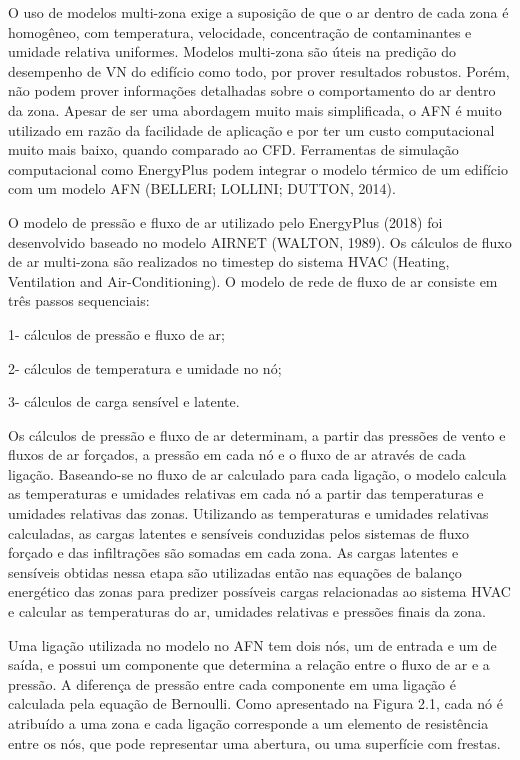\documentclass[brazil,hardcopy,openany,a5paper]{ufscthesis}
\begin{document}
	O uso de modelos multi-zona exige a suposição de que o ar dentro de cada zona é homogêneo, com temperatura, velocidade, concentração de contaminantes e umidade relativa uniformes. Modelos multi-zona são úteis na predição do desempenho de VN do edifício como todo, por prover resultados robustos. Porém, não podem prover informações detalhadas sobre o comportamento do
	ar dentro da zona. Apesar de ser uma abordagem muito mais simplificada, o AFN é muito utilizado em razão da facilidade de aplicação e por ter um custo computacional muito mais baixo, quando comparado ao CFD. Ferramentas de simulação computacional como EnergyPlus podem integrar o modelo térmico de um edifício com um modelo AFN (BELLERI; LOLLINI; DUTTON, 2014).
	
	O modelo de pressão e fluxo de ar utilizado pelo EnergyPlus (2018) foi desenvolvido baseado no modelo AIRNET (WALTON, 1989). Os cálculos de fluxo de ar multi-zona são realizados no timestep do sistema HVAC (Heating, Ventilation and Air-Conditioning). O modelo de rede de fluxo de ar consiste em três passos sequenciais:
	
	1- cálculos de pressão e fluxo de ar;
	
	2- cálculos de temperatura e umidade no nó;
	
	3- cálculos de carga sensível e latente.
	
	Os cálculos de pressão e fluxo de ar determinam, a partir das pressões de vento e fluxos de ar forçados, a pressão em cada nó e o fluxo de ar através de cada ligação. Baseando-se no fluxo de ar calculado para cada ligação, o modelo	calcula as temperaturas e umidades relativas em cada nó a partir das temperaturas e umidades relativas das zonas. Utilizando as temperaturas e umidades relativas calculadas, as cargas latentes e sensíveis conduzidas pelos	sistemas de fluxo forçado e das infiltrações são somadas em cada zona. As cargas latentes e sensíveis obtidas nessa etapa são utilizadas então nas equações de balanço energético das zonas para predizer possíveis cargas relacionadas ao sistema HVAC e calcular as temperaturas do ar, umidades relativas e pressões finais da zona.
	
	Uma ligação utilizada no modelo no AFN tem dois nós, um de entrada e um de saída, e possui um componente que determina a relação entre o fluxo de ar e a pressão. A diferença de pressão entre cada componente em uma ligação é calculada pela equação de Bernoulli. Como apresentado na Figura 2.1, cada nó é atribuído a uma zona e cada ligação corresponde a um elemento de resistência entre os nós, que pode representar uma abertura, ou uma superfície com frestas.
	
\end{document}
